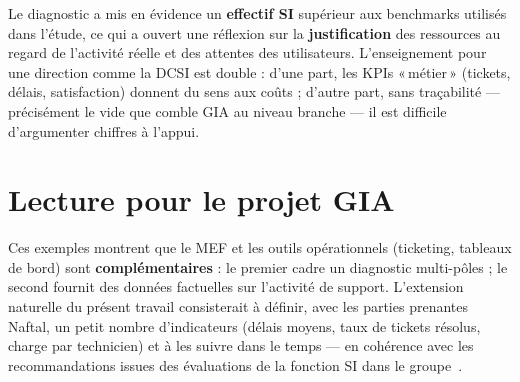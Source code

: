 Le diagnostic a mis en évidence un \textbf{effectif SI} supérieur aux benchmarks utilisés dans
l'étude, ce qui a ouvert une réflexion sur la \textbf{justification} des ressources au regard de
l'activité réelle et des attentes des utilisateurs. L'enseignement pour une direction comme la DCSI
est double : d'une part, les KPIs «\,métier\,» (tickets, délais, satisfaction) donnent du sens aux
coûts ; d'autre part, sans traçabilité — précisément le vide que comble GIA au niveau branche — il
est difficile d'argumenter chiffres à l'appui.

\section{Lecture pour le projet GIA}
Ces exemples montrent que le MEF et les outils opérationnels (ticketing, tableaux de bord) sont
\textbf{complémentaires} : le premier cadre un diagnostic multi-pôles ; le second fournit des
données factuelles sur l'activité de support. L'extension naturelle du présent travail consisterait
à définir, avec les parties prenantes Naftal, un petit nombre d'indicateurs (délais moyens, taux de
tickets résolus, charge par technicien) et à les suivre dans le temps — en cohérence avec les
recommandations issues des évaluations de la fonction SI dans le groupe~\cite{meghari2014}.
